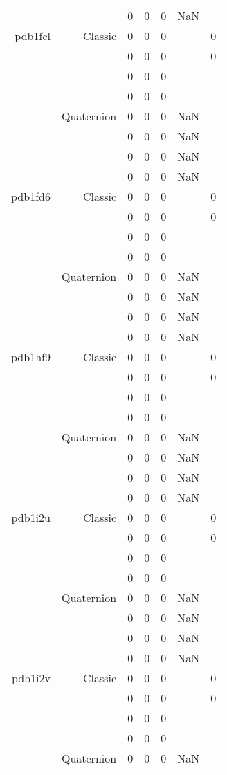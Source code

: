 \begin{xltabular}{\textwidth}{r|rcccSc}
& & 0 & 0 & 0 & NaN & \\ \addlinespace
pdb1fcl & Classic & 0 & 0 & 0 & & 0 \\
& & 0 & 0 & 0 & & 0 \\
& & 0 & 0 & 0 & & \\
& & 0 & 0 & 0 & & \\
& Quaternion & 0 & 0 & 0 & NaN & \\
& & 0 & 0 & 0 & NaN & \\
& & 0 & 0 & 0 & NaN & \\
& & 0 & 0 & 0 & NaN & \\ \addlinespace
pdb1fd6 & Classic & 0 & 0 & 0 & & 0 \\
& & 0 & 0 & 0 & & 0 \\
& & 0 & 0 & 0 & & \\
& & 0 & 0 & 0 & & \\
& Quaternion & 0 & 0 & 0 & NaN & \\
& & 0 & 0 & 0 & NaN & \\
& & 0 & 0 & 0 & NaN & \\
& & 0 & 0 & 0 & NaN & \\ \addlinespace
pdb1hf9 & Classic & 0 & 0 & 0 & & 0 \\
& & 0 & 0 & 0 & & 0 \\
& & 0 & 0 & 0 & & \\
& & 0 & 0 & 0 & & \\
& Quaternion & 0 & 0 & 0 & NaN & \\
& & 0 & 0 & 0 & NaN & \\
& & 0 & 0 & 0 & NaN & \\
& & 0 & 0 & 0 & NaN & \\ \addlinespace
pdb1i2u & Classic & 0 & 0 & 0 & & 0 \\
& & 0 & 0 & 0 & & 0 \\
& & 0 & 0 & 0 & & \\
& & 0 & 0 & 0 & & \\
& Quaternion & 0 & 0 & 0 & NaN & \\
& & 0 & 0 & 0 & NaN & \\
& & 0 & 0 & 0 & NaN & \\
& & 0 & 0 & 0 & NaN & \\ \addlinespace
pdb1i2v & Classic & 0 & 0 & 0 & & 0 \\
& & 0 & 0 & 0 & & 0 \\
& & 0 & 0 & 0 & & \\
& & 0 & 0 & 0 & & \\
& Quaternion & 0 & 0 & 0 & NaN & \\

\end{xltabular}
